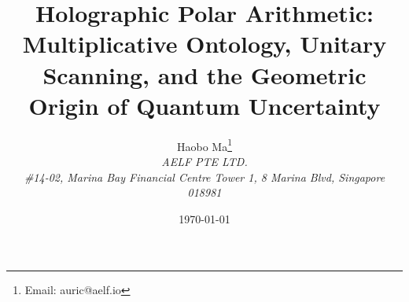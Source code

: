 \documentclass[11pt,a4paper]{article}
\title{Holographic Polar Arithmetic: Multiplicative Ontology, Unitary Scanning, and the Geometric Origin of Quantum Uncertainty}
\author{Haobo Ma\thanks{Email: auric@aelf.io} \\
\textit{AELF PTE LTD.} \\
\textit{\#14-02, Marina Bay Financial Centre Tower 1, 8 Marina Blvd, Singapore 018981}}
\date{\today}
\begin{document}
\maketitle














\FloatBarrier
\appendix






\FloatBarrier

\end{document}
